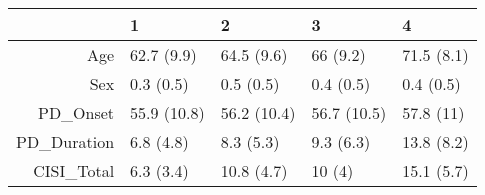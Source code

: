 \begin{table}[ht]
\centering
\begin{tabular}{rllll}
  \toprule
 & 1 & 2 & 3 & 4 \\ 
  \midrule
Age & 62.7 (9.9) & 64.5 (9.6) & 66 (9.2) & 71.5 (8.1) \\ 
  Sex & 0.3 (0.5) & 0.5 (0.5) & 0.4 (0.5) & 0.4 (0.5) \\ 
  PD\_Onset & 55.9 (10.8) & 56.2 (10.4) & 56.7 (10.5) & 57.8 (11) \\ 
  PD\_Duration & 6.8 (4.8) & 8.3 (5.3) & 9.3 (6.3) & 13.8 (8.2) \\ 
  CISI\_Total & 6.3 (3.4) & 10.8 (4.7) & 10 (4) & 15.1 (5.7) \\ 
   \bottomrule
\end{tabular}
\end{table}
